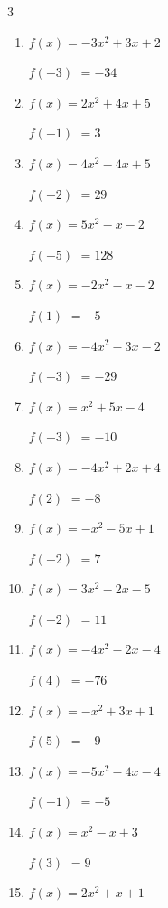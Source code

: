 \begin{multicols}{3}
\begin{enumerate}
$f(3)$
        $= -28$

\columnbreak %

  \item $f(x)=-3x^{2}+3x+2$

$f(-3)$
        $= -34$

  \item $f(x)=2x^{2}+4x+5$

$f(-1)$
        $= 3$

  \item $f(x)=4x^{2}-4x+5$

$f(-2)$
        $= 29$

  \item $f(x)=5x^{2}-x-2$

$f(-5)$
        $= 128$

  \item $f(x)=-2x^{2}-x-2$

$f(1)$
        $= -5$

  \item $f(x)=-4x^{2}-3x-2$

$f(-3)$
        $= -29$

  \item $f(x)=x^{2}+5x-4$

$f(-3)$
        $= -10$

  \item $f(x)=-4x^{2}+2x+4$

$f(2)$
        $= -8$

  \item $f(x)=-x^{2}-5x+1$

$f(-2)$
        $= 7$

  \item $f(x)=3x^{2}-2x-5$

$f(-2)$
        $= 11$

  \item $f(x)=-4x^{2}-2x-4$

$f(4)$
        $= -76$

  \item $f(x)=-x^{2}+3x+1$

$f(5)$
        $= -9$

  \item $f(x)=-5x^{2}-4x-4$

$f(-1)$
        $= -5$

  \item $f(x)=x^{2}-x+3$

$f(3)$
        $= 9$

  \item $f(x)=2x^{2}+x+1$


\end{enumerate}
\end{multicols}
